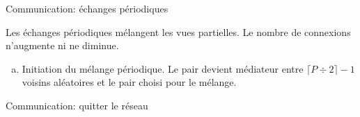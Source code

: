 \begin{frame}{Communication}{\SPRAY : échanges périodiques}
 
  Les échanges périodiques mélangent les vues partielles. Le nombre de
  connexions n'augmente ni ne diminue.
 
  \vspace{0.5cm}

  \begin{minipage}{0.6\textwidth}
    \begin{enumerate}[(a)]
    \item Initiation du mélange périodique. Le pair devient médiateur entre
      $\lceil P \div 2 \rceil - 1$ voisins aléatoires et le pair choisi pour le
      mélange. 
    \end{enumerate}
  \end{minipage}
  \begin{minipage}{0.37\textwidth}
    \begin{center}
      
    \end{center}
  \end{minipage}


  \vspace{0.5cm}
  \large
  \begin{itemize}
  \end{itemize}
  
\end{frame}

\begin{frame}{Communication}{\SPRAY : quitter le réseau}

\end{frame}
